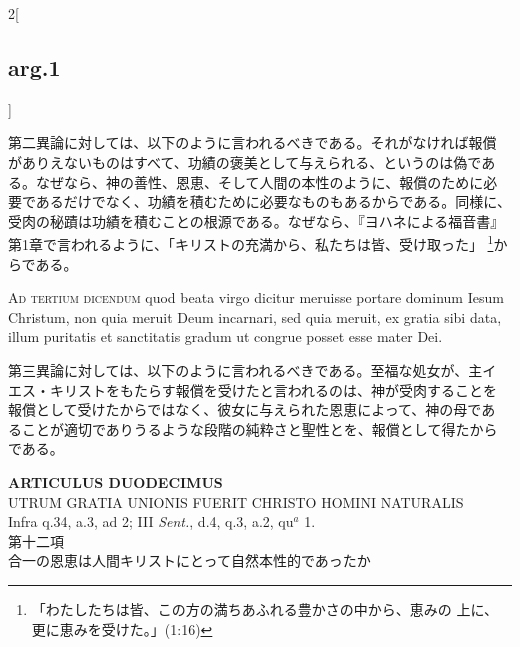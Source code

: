 \documentclass[paper=a4paper,fontsize=10pt,jafontsize=9pt,titlepage]{jlreq}
\begin{document}
\begin{paracol}{2}[\subsection{arg.1}]
\switchcolumn

第二異論に対しては、以下のように言われるべきである。それがなければ報償
がありえないものはすべて、功績の褒美として与えられる、というのは偽であ
る。なぜなら、神の善性、恩恵、そして人間の本性のように、報償のために必
要であるだけでなく、功績を積むために必要なものもあるからである。同様に、
受肉の秘蹟は功績を積むことの根源である。なぜなら、『ヨハネによる福音書』
第1章で言われるように、「キリストの充満から、私たちは皆、受け取った」
\footnote{「わたしたちは皆、この方の満ちあふれる豊かさの中から、恵みの
上に、更に恵みを受けた。」(1:16)}からである。

\switchcolumn*[\subsection{ad.3}]

{\scshape Ad tertium dicendum} quod beata virgo dicitur meruisse
portare dominum Iesum Christum, non quia meruit Deum incarnari, sed
quia meruit, ex gratia sibi data, illum puritatis et sanctitatis
gradum ut congrue posset esse mater Dei.

\switchcolumn

第三異論に対しては、以下のように言われるべきである。至福な処女が、主イ
エス・キリストをもたらす報償を受けたと言われるのは、神が受肉することを
報償として受けたからではなく、彼女に与えられた恩恵によって、神の母であ
ることが適切でありうるような段階の純粋さと聖性とを、報償として得たから
である。

\end{paracol}
\newpage




{}
\setcounter{section}{12}
\setcounter{subsection}{0}
\begin{center}
{\Large {\bfseries ARTICULUS DUODECIMUS}}\\ {\large UTRUM GRATIA UNIONIS
FUERIT CHRISTO HOMINI NATURALIS}\\ {\footnotesize Infra q.34, a.3, ad
2; III {\itshape Sent.}, d.4, q.3, a.2, qu$^a$ 1.}\\ {\Large 第十二項
\\合一の恩恵は人間キリストにとって自然本性的であったか}
\end{center}
\end{document}
